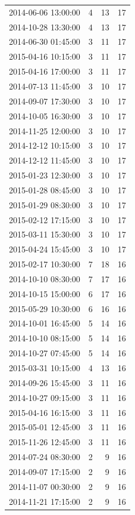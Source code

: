 \begin{tabular}{lrrr}
2014-06-06 13:00:00 & 4 & 13 & 17 \\
2014-10-28 13:30:00 & 4 & 13 & 17 \\
2014-06-30 01:45:00 & 3 & 11 & 17 \\
2015-04-16 10:15:00 & 3 & 11 & 17 \\
2015-04-16 17:00:00 & 3 & 11 & 17 \\
2014-07-13 11:45:00 & 3 & 10 & 17 \\
2014-09-07 17:30:00 & 3 & 10 & 17 \\
2014-10-05 16:30:00 & 3 & 10 & 17 \\
2014-11-25 12:00:00 & 3 & 10 & 17 \\
2014-12-12 10:15:00 & 3 & 10 & 17 \\
2014-12-12 11:45:00 & 3 & 10 & 17 \\
2015-01-23 12:30:00 & 3 & 10 & 17 \\
2015-01-28 08:45:00 & 3 & 10 & 17 \\
2015-01-29 08:30:00 & 3 & 10 & 17 \\
2015-02-12 17:15:00 & 3 & 10 & 17 \\
2015-03-11 15:30:00 & 3 & 10 & 17 \\
2015-04-24 15:45:00 & 3 & 10 & 17 \\
2015-02-17 10:30:00 & 7 & 18 & 16 \\
2014-10-10 08:30:00 & 7 & 17 & 16 \\
2014-10-15 15:00:00 & 6 & 17 & 16 \\
2015-05-29 10:30:00 & 6 & 16 & 16 \\
2014-10-01 16:45:00 & 5 & 14 & 16 \\
2014-10-10 08:15:00 & 5 & 14 & 16 \\
2014-10-27 07:45:00 & 5 & 14 & 16 \\
2015-03-31 10:15:00 & 4 & 13 & 16 \\
2014-09-26 15:45:00 & 3 & 11 & 16 \\
2014-10-27 09:15:00 & 3 & 11 & 16 \\
2015-04-16 16:15:00 & 3 & 11 & 16 \\
2015-05-01 12:45:00 & 3 & 11 & 16 \\
2015-11-26 12:45:00 & 3 & 11 & 16 \\
2014-07-24 08:30:00 & 2 & 9 & 16 \\
2014-09-07 17:15:00 & 2 & 9 & 16 \\
2014-11-07 00:30:00 & 2 & 9 & 16 \\
2014-11-21 17:15:00 & 2 & 9 & 16 \\

\end{tabular}
